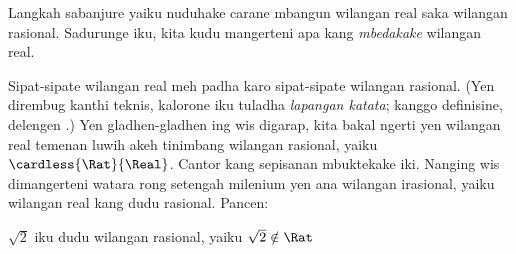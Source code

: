 \documentclass[../../../include/open-logic-section]{subfiles}
\begin{document}

Langkah sabanjure yaiku nuduhake carane mbangun wilangan real saka
wilangan rasional. Sadurunge iku, kita kudu mangerteni apa kang
\emph{mbedakake} wilangan real.

Sipat-sipate wilangan real meh padha karo sipat-sipate wilangan rasional.
(Yen dirembug kanthi teknis, kalorone iku tuladha \emph{lapangan katata}; kanggo definisine,
delengen .) Yen gladhen-gladhen ing
 wis digarap, kita bakal ngerti yen wilangan real
temenan luwih akeh tinimbang wilangan rasional, yaiku
$\cardless{\Rat}{\Real}$. Cantor kang sepisanan mbuktekake iki. Nanging
wis dimangerteni watara rong setengah milenium yen ana wilangan irasional,
yaiku wilangan real kang dudu rasional. Pancen:
\begin{thm}
$\sqrt{2}$ iku dudu wilangan rasional, yaiku $\sqrt{2} \notin \Rat$
\end{thm}
\end{document}

